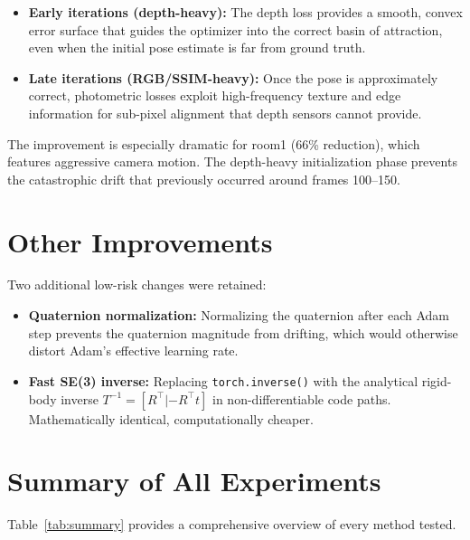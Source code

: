 \documentclass[10pt,twocolumn]{article}
\begin{document}
\begin{itemize}
    \item \textbf{Early iterations (depth-heavy):} The depth loss provides a smooth, convex error surface that guides the optimizer into the correct basin of attraction, even when the initial pose estimate is far from ground truth.
    \item \textbf{Late iterations (RGB/SSIM-heavy):} Once the pose is approximately correct, photometric losses exploit high-frequency texture and edge information for sub-pixel alignment that depth sensors cannot provide.
\end{itemize}

The improvement is especially dramatic for room1 (66\% reduction), which features aggressive camera motion. The depth-heavy initialization phase prevents the catastrophic drift that previously occurred around frames 100--150.

\section{Other Improvements}

Two additional low-risk changes were retained:

\begin{itemize}
    \item \textbf{Quaternion normalization:} Normalizing the quaternion after each Adam step prevents the quaternion magnitude from drifting, which would otherwise distort Adam's effective learning rate.
    \item \textbf{Fast SE(3) inverse:} Replacing \texttt{torch.inverse()} with the analytical rigid-body inverse $T^{-1} = [R^\top | -R^\top t]$ in non-differentiable code paths. Mathematically identical, computationally cheaper.
\end{itemize}

\section{Summary of All Experiments}

Table~\ref{tab:summary} provides a comprehensive overview of every method tested.
\end{document}
